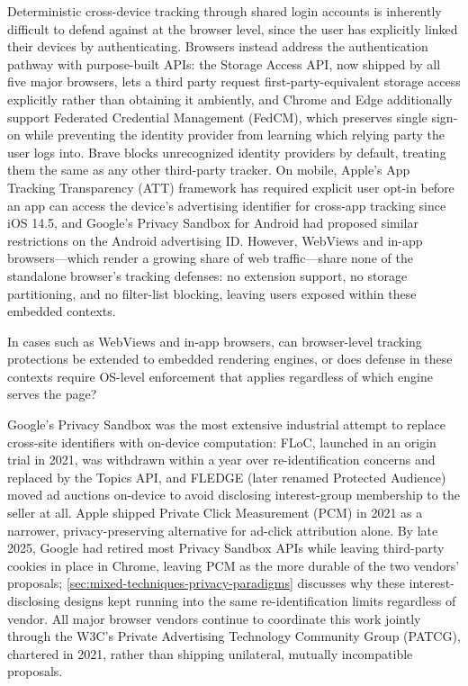 %
Deterministic cross-device tracking through shared login accounts is inherently difficult to defend against at the browser level, since the user has explicitly linked their devices by authenticating.
%
Browsers instead address the authentication pathway with purpose-built APIs: the Storage Access API, now shipped by all five major browsers, lets a third party request first-party-equivalent storage access explicitly rather than obtaining it ambiently, and Chrome and Edge additionally support Federated Credential Management (FedCM), which preserves single sign-on while preventing the identity provider from learning which relying party the user logs into.
%
Brave blocks unrecognized identity providers by default, treating them the same as any other third-party tracker.
%
On mobile, Apple's App Tracking Transparency (ATT) framework has required explicit user opt-in before an app can access the device's advertising identifier for cross-app tracking since iOS 14.5, and Google's Privacy Sandbox for Android had proposed similar restrictions on the Android advertising ID.
%
%
However, WebViews and in-app browsers---which render a growing share of web traffic---share none of the standalone browser's tracking defenses: no extension support, no storage partitioning, and no filter-list blocking, leaving users exposed within these embedded contexts.

\begin{opbox}
In cases such as WebViews and in-app browsers, can browser-level tracking protections be extended to embedded rendering engines, or does defense in these contexts require OS-level enforcement that applies regardless of which engine serves the page?
\end{opbox}


Google's Privacy Sandbox was the most extensive industrial attempt to replace cross-site identifiers with on-device computation: FLoC, launched in an origin trial in 2021, was withdrawn within a year over re-identification concerns and replaced by the Topics API, and FLEDGE (later renamed Protected Audience) moved ad auctions on-device to avoid disclosing interest-group membership to the seller at all.
%
Apple shipped Private Click Measurement (PCM) in 2021 as a narrower, privacy-preserving alternative for ad-click attribution alone.
%
By late 2025, Google had retired most Privacy Sandbox APIs while leaving third-party cookies in place in Chrome, leaving PCM as the more durable of the two vendors' proposals; \autoref{sec:mixed-techniques-privacy-paradigms} discusses why these interest-disclosing designs kept running into the same re-identification limits regardless of vendor.
%
All major browser vendors continue to coordinate this work jointly through the W3C's Private Advertising Technology Community Group (PATCG), chartered in 2021, rather than shipping unilateral, mutually incompatible proposals.


